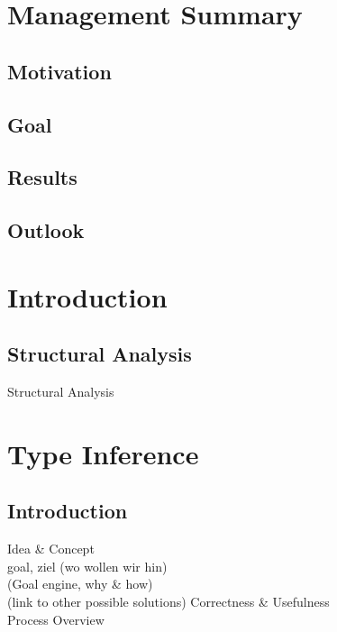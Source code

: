 \documentclass[12pt,halfparskip]{scrreprt}
\begin{document}
\chapter*{Management Summary}

\section*{Motivation}

\section*{Goal}

\section*{Results}

\section*{Outlook}


\newpage

\tableofcontents

\newpage
{}
\pagestyle{scrheadings}

\chapter{Introduction}

\section{Structural Analysis}

Structural Analysis

\chapter{Type Inference}

\section{Introduction}

Idea \& Concept \\
goal, ziel (wo wollen wir hin)\\
(Goal engine, why \& how) \\
(link to other possible solutions)
Correctness \& Usefulness \\
Process Overview \\
\end{document}
